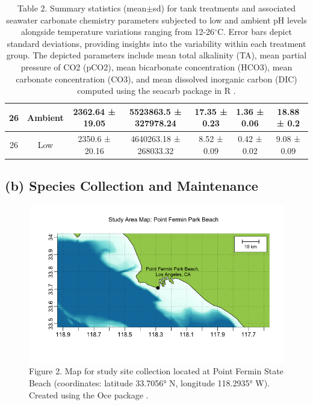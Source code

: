 \documentclass[
]{article}
\begin{document}
\begin{table}[!ht]
\begin{tabular}{|c|c|c|c|c|c|c|}
        26 & Ambient & 2362.64 ± 19.05 & 5523863.5 ± 327978.24 & 17.35 ± 0.23 & 1.36 ± 0.06 & 18.88 ± 0.2 \\ \hline
        26 & Low & 2350.6 ± 20.16 & 4640263.18 ± 268033.32 & 8.52 ± 0.09 & 0.42 ± 0.02 & 9.08 ± 0.09 \\ \hline
    \end{tabular}
    \caption{Table 2. Summary statistics (mean$\pm$sd) for tank treatments and associated seawater carbonate chemistry parameters subjected to low and ambient pH levels alongside temperature variations ranging from 12-26$^\circ$C. Error bars depict standard deviations, providing insights into the variability within each treatment group. The depicted parameters include mean total alkalinity (TA), mean partial pressure of CO2 (pCO2), mean bicarbonate concentration (HCO3), mean carbonate concentration (CO3), and mean dissolved inorganic carbon (DIC) computed using the seacarb package in R \citep{gattuso2015package}.}
    \label{carbonate-stat-summary}
\end{table}

\hypertarget{b-species-collection-and-maintenance}{%
\subsection{(b) Species Collection and
Maintenance}\label{b-species-collection-and-maintenance}}

\begin{figure}[htbp]
    \centering
    \includegraphics[width=1\textwidth]{Images/map.png}
    \caption{Figure 2. Map for study site collection located at Point Fermin State Beach (coordinates: latitude 33.7056° N, longitude 118.2935° W). Created using the Oce package \citep{kelley2018oce}.}
    \label{fig:study-site-map}
\end{figure}
\end{document}
